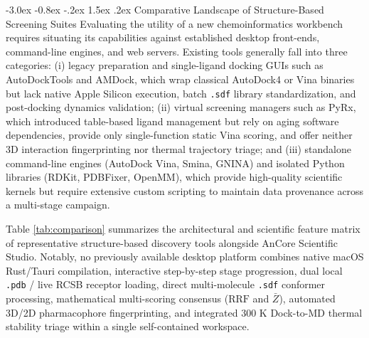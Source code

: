 \documentclass[11pt,a4paper]{article}
\makeatletter
\renewcommand{\section}{\@startsection{section}{1}{\z@}%
  {-3.0ex \@plus -0.8ex \@minus -.2ex}%
  {1.5ex \@plus.2ex}%
  {\normalfont\Large\bfseries\color{primary}}}
\makeatother
\begin{document}
\section{Comparative Landscape of Structure-Based Screening Suites}
\noindent Evaluating the utility of a new chemoinformatics workbench requires situating its capabilities against established desktop front-ends, command-line engines, and web servers. Existing tools generally fall into three categories: (i) legacy preparation and single-ligand docking GUIs such as AutoDockTools and AMDock, which wrap classical AutoDock4 or Vina binaries but lack native Apple Silicon execution, batch \texttt{.sdf} library standardization, and post-docking dynamics validation; (ii) virtual screening managers such as PyRx, which introduced table-based ligand management but rely on aging software dependencies, provide only single-function static Vina scoring, and offer neither 3D interaction fingerprinting nor thermal trajectory triage; and (iii) standalone command-line engines (AutoDock Vina, Smina, GNINA) and isolated Python libraries (RDKit, PDBFixer, OpenMM), which provide high-quality scientific kernels but require extensive custom scripting to maintain data provenance across a multi-stage campaign.

Table \ref{tab:comparison} summarizes the architectural and scientific feature matrix of representative structure-based discovery tools alongside AnCore Scientific Studio. Notably, no previously available desktop platform combines native macOS Rust/Tauri compilation, interactive step-by-step stage progression, dual local \texttt{.pdb} / live RCSB receptor loading, direct multi-molecule \texttt{.sdf} conformer processing, mathematical multi-scoring consensus ($\text{RRF}$ and $\bar{Z}$), automated 3D/2D pharmacophore fingerprinting, and integrated $300\text{ K}$ Dock-to-MD thermal stability triage within a single self-contained workspace.
\end{document}
